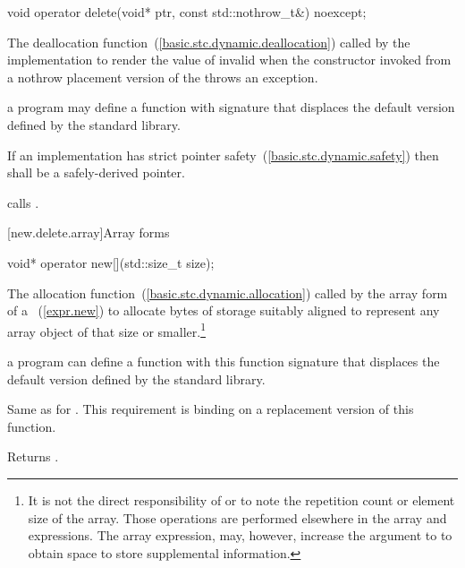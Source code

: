 %
\begin{itemdecl}
void operator delete(void* ptr, const std::nothrow_t&) noexcept;
\end{itemdecl}

\begin{itemdescr}
\pnum
\effects
The
deallocation function~(\ref{basic.stc.dynamic.deallocation})
called by the implementation
to render the value of  invalid
when the constructor invoked from a nothrow
placement version of the  throws an exception.

\pnum
\replaceable
a \Cpp program may define a function with signature
that displaces the default version defined by the
\Cpp standard library.

\pnum
\requires
If an implementation has strict pointer safety~(\ref{basic.stc.dynamic.safety})
then  shall be a safely-derived pointer.

\pnum
{}
{} calls
.
\end{itemdescr}

[new.delete.array]{Array forms}

%
\begin{itemdecl}
void* operator new[](std::size_t size);
\end{itemdecl}

\begin{itemdescr}
\pnum
\effects
The
allocation function~(\ref{basic.stc.dynamic.allocation})
called by the array form of a
~(\ref{expr.new})
to allocate  bytes of storage suitably aligned to represent any array
object of that size or smaller.\footnote{It is not the direct responsibility of
or
to note the repetition count or element size of the array.
Those operations are performed elsewhere in the array
and
expressions.
The array
expression, may, however, increase the  argument to
to obtain space to store supplemental information.}

\pnum
\replaceable
a \Cpp program can define a
function with this function signature that displaces the default version
defined by the \Cpp standard library.

\pnum
\required
Same as for
.
This requirement is binding on a replacement version of this function.

\pnum
{}
Returns
.
\end{itemdescr}

